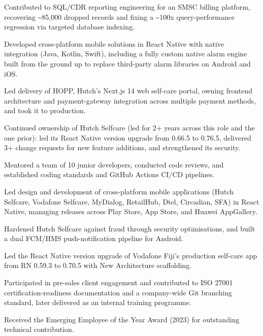 \documentclass[10.5pt]{article}
\begin{document}
\begin{cvitems}
  \item Contributed to SQL/CDR reporting engineering for an SMSC billing platform, recovering \textasciitilde85,000 dropped records and fixing a \textasciitilde100x query-performance regression via targeted database indexing.
  \item Developed cross-platform mobile solutions in React Native with native integration (Java, Kotlin, Swift), including a fully custom native alarm engine built from the ground up to replace third-party alarm libraries on Android and iOS.
  \item Led delivery of HOPP, Hutch's Next.js 14 web self-care portal, owning frontend architecture and payment-gateway integration across multiple payment methods, and took it to production.
  \item Continued ownership of Hutch Selfcare (led for 2+ years across this role and the one prior): led its React Native version upgrade from 0.66.5 to 0.76.5, delivered 3+ change requests for new feature additions, and strengthened its security.
  \item Mentored a team of 10 junior developers, conducted code reviews, and established coding standards and GitHub Actions CI/CD pipelines.
\end{cvitems}

\begin{cvitems}
  \item Led design and development of cross-platform mobile applications (Hutch Selfcare, Vodafone Selfcare, MyDialog, RetailHub, Dtel, Circadian, SFA) in React Native, managing releases across Play Store, App Store, and Huawei AppGallery.
  \item Hardened Hutch Selfcare against fraud through security optimisations, and built a dual FCM/HMS push-notification pipeline for Android.
  \item Led the React Native version upgrade of Vodafone Fiji's production self-care app from RN 0.59.3 to 0.70.5 with New Architecture scaffolding.
  \item Participated in pre-sales client engagement and contributed to ISO 27001 certification-readiness documentation and a company-wide Git branching standard, later delivered as an internal training programme.
  \item Received the Emerging Employee of the Year Award (2023) for outstanding technical contribution.
\end{cvitems}
\end{document}
